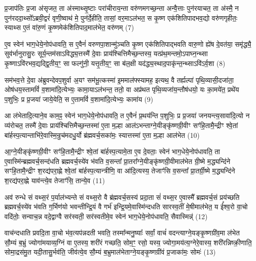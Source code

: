प्र॒जाप॑तिः प्र॒जा अ॑सृजत॒ ता अ॑स्माथ्सृ॒ष्टाः परा॑चीराय॒न्ता वरु॑णमगच्छ॒न्ता अन्वै॒त्ताः पुन॑रयाचत॒ ता अ॑स्मै॒ न पुन॑रददा॒थ्सो᳚\-ऽब्रवी॒द्वरं॑ वृणी॒ष्वाथ॑ मे॒ पुन॑र्दे॒हीति॒ तासां॒ वर॒मा\-ऽल॑भत॒ स कृ॒ष्ण एक॑शितिपादभव॒द्यो वरु॑णगृहीतः॒ स्याथ्स ए॒तं वा॑रु॒णं कृ॒ष्णमेक॑शितिपाद॒माल॑भेत॒ वरु॑णम् (7)

ए॒व स्वेन॑ भाग॒धेये॒नोप॑धावति॒ स ए॒वैनं॑ वरुणपा॒शान्मु॑ञ्चति कृ॒ष्ण एक॑शितिपाद्भवति वारु॒णो ह्ये॑ष दे॒वत॑या॒ समृ॑द्ध्यै॒ सुव॑र्भानुरासु॒रः सूर्य॒न्तम॑सा\-ऽविद्ध्य॒त्तस्मै॑ दे॒वाः प्राय॑श्चित्तिमैच्छ॒न्तस्य॒ यत्प्र॑थ॒मन्तमो॒\-ऽपाघ्न॒न्थ्सा कृ॒ष्णा\-ऽवि॑रभव॒द्यद्द्वि॒तीय॒ꣳ॒ सा फल्गु॑नी॒ यत्तृ॒तीय॒ꣳ॒ सा ब॑ल॒क्षी यद॑द्ध्य॒स्थाद॒पाकृ॑न्त॒न्थ्सा\-ऽवि॑\-ऽर्व॒शा (8)

सम॑भव॒त्ते दे॒वा अ॑ब्रुवन्देवप॒शुर्वा अ॒यꣳ सम॑भू॒त्कस्मा॑ इ॒ममाल॑फ्स्यामह॒ इत्यथ॒ वै तर्ह्यल्पा॑ पृथि॒व्यासी॒दजा॑ता॒ ओष॑धय॒स्तामविं॑ व॒शामा॑दि॒त्येभ्यः॒ कामा॒या\-ऽल॑भन्त॒ ततो॒ वा अप्र॑थत पृथि॒व्यजा॑य॒न्तौष॑धयो॒ यः का॒मये॑त॒ प्रथे॑य प॒शुभिः॒ प्र प्र॒जया॑ जाये॒येति॒ स ए॒तामविं॑ व॒शामा॑दि॒त्येभ्यः॒ कामा॑य (9)

आ ल॑भेतादि॒त्याने॒व काम॒ꣴ॒ स्वेन॑ भाग॒धेये॒नोप॑धावति॒ त ए॒वैनं॑ प्र॒थय॑न्ति प॒शुभिः॒ प्र प्र॒जया॑ जनयन्त्य॒सावा॑दि॒त्यो न व्य॑रोचत॒ तस्मै॑ दे॒वाः प्राय॑श्चित्तिमैच्छ॒न्तस्मा॑ ए॒ता म॒ल्\mbox{}हा आल॑\-ऽभन्ताग्ने॒यीङ्कृ॑ष्णग्री॒वीꣳ सꣳ॑हि॒तामै॒न्द्रीꣳ श्वे॒तां बा॑र्\mbox{}हस्प॒त्यान्ताभि॑रे॒वास्मि॒न्रुच॑मदधु॒र्यो ब्र॑ह्मवर्च॒सका॑मः॒ स्यात्तस्मा॑ ए॒ता म॒ल्\mbox{}हा आल॑भेत (10)

आ॒ग्ने॒यीङ्कृ॑ष्णग्री॒वीꣳ सꣳ॑हि॒तामै॒न्द्रीꣳ श्वे॒तां बा॑र्\mbox{}हस्प॒त्यामे॒ता ए॒व दे॒वताः॒ स्वेन॑ भाग॒धेये॒नोप॑धावति॒ ता ए॒वास्मि॑न्ब्रह्मवर्च॒सन्द॑धति ब्रह्मवर्च॒स्ये॑व भ॑वति व॒सन्ता᳚ प्रा॒तरा᳚ग्ने॒यीङ्कृ॑ष्णग्री॒वीमाल॑भेत ग्री॒ष्मे म॒द्ध्यन्दि॑ने सꣳहि॒तामै॒न्द्रीꣳ श॒रद्य॑परा॒ह्णे श्वे॒तां बा॑र्\mbox{}हस्प॒त्यान्त्रीणि॒ वा आ॑दि॒त्यस्य॒ तेजाꣳ॑सि व॒सन्ता᳚ प्रा॒तर्ग्री॒ष्मे म॒द्ध्यन्दि॑ने श॒रद्य॑परा॒ह्णे याव॑न्त्ये॒व तेजाꣳ॑सि॒ तान्ये॒व (11)

अव॑ रुन्धे सं वथ्स॒रं प॒र्याल॑भ्यन्ते सं वथ्स॒रो वै ब्र॑ह्मवर्च॒सस्य॑ प्रदा॒ता सं॑ वथ्स॒र ए॒वास्मै᳚ ब्रह्मवर्च॒सं प्रय॑च्छति ब्रह्मवर्च॒स्ये॑व भ॑वति ग॒र्भिण॑यो भवन्तीन्द्रि॒यं वै गर्भ॑ इन्द्रि॒यमे॒वास्मि॑न्दधति सारस्व॒तीं मे॒षीमाल॑भेत॒ य ई᳚श्व॒रो वा॒चो वदि॑तोः॒ सन्वाच॒न्न वदे॒द्वाग्वै सर॑स्वती॒ सर॑स्वतीमे॒व स्वेन॑ भाग॒धेये॒नोप॑धावति॒ सैवास्मिन्न्॑ (12)

वाच॑न्दधाति प्रवदि॒ता वा॒चो भ॑व॒त्यप॑न्नदती भवति॒ तस्मा᳚न्मनु॒ष्याः᳚ सर्वां॒ वाचं॑ वदन्त्याग्ने॒यङ्कृ॒ष्णग्री॑व॒मा ल॑भेत सौ॒म्यं ब॒भ्रुं ज्योगा॑मयाव्य॒ग्निं वा ए॒तस्य॒ शरी॑रं गच्छति॒ सोम॒ꣳ॒ रसो॒ यस्य॒ ज्योगा॒मय॑त्य॒ग्नेरे॒वास्य॒ शरी॑रन्निष्क्री॒णाति॒ सोमा॒द्रस॑मु॒त यदी॒तासु॒र्भव॑ति॒ जीव॑त्ये॒व सौ॒म्यं ब॒भ्रुमाल॑भेताग्ने॒यङ्कृ॒ष्णग्री॑वं प्र॒जाका॑मः॒ सोमः॑ (13)

